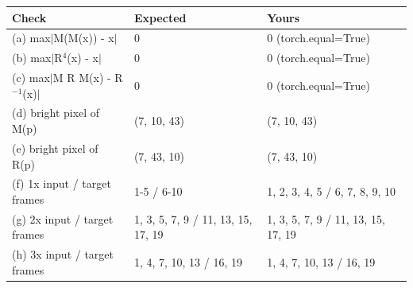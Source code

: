 \begin{tabular}{lll}
\toprule
Check & Expected & Yours \\
\midrule
(a) max$|$M(M(x)) - x$|$ & 0 & 0 (torch.equal=True) \\
(b) max$|$R$^4$(x) - x$|$ & 0 & 0 (torch.equal=True) \\
(c) max$|$M R M(x) - R$^{-1}$(x)$|$ & 0 & 0 (torch.equal=True) \\
(d) bright pixel of M(p) & (7, 10, 43) & (7, 10, 43) \\
(e) bright pixel of R(p) & (7, 43, 10) & (7, 43, 10) \\
(f) 1x input / target frames & 1-5 / 6-10 & 1, 2, 3, 4, 5 / 6, 7, 8, 9, 10 \\
(g) 2x input / target frames & 1, 3, 5, 7, 9 / 11, 13, 15, 17, 19 & 1, 3, 5, 7, 9 / 11, 13, 15, 17, 19 \\
(h) 3x input / target frames & 1, 4, 7, 10, 13 / 16, 19 & 1, 4, 7, 10, 13 / 16, 19 \\
\bottomrule
\end{tabular}
